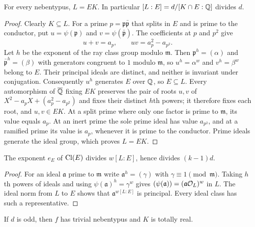 \begin{lemma}\label{dir:lem:valuefield}
For every nebentypus, $L=EK$. In particular $[L:E]=d/[K\cap E:\mathbb{Q}]$ divides $d$.
\end{lemma}

\begin{proof}
Clearly $K\subseteq L$. For a prime $p=\mathfrak p\bar{\mathfrak p}$ that splits in $E$
and is prime to the conductor, put $u=\psi(\mathfrak p)$ and
$v=\psi(\bar{\mathfrak p})$. The coefficients at $p$ and $p^2$ give
\[
 u+v=a_p,\qquad uv=a_p^2-a_{p^2}.
\]
Let $h$ be the exponent of the ray class group modulo $\mathfrak m$. Then
$\mathfrak p^h=(\alpha)$ and $\bar{\mathfrak p}^h=(\beta)$ with generators congruent to
$1$ modulo $\mathfrak m$, so $u^h=\alpha^w$ and $v^h=\beta^w$ belong to $E$. Their
principal ideals are distinct, and neither is invariant under conjugation.
Consequently $u^h$ generates $E$ over $\mathbb{Q}$, so $E\subseteq L$. Every automorphism of
$\overline{\mathbb{Q}}$ fixing $EK$ preserves the pair of roots $u,v$ of
$X^2-a_pX+(a_p^2-a_{p^2})$ and fixes their distinct $h$th powers; it therefore fixes
each root, and $u,v\in EK$. At a split prime where only one factor is prime to
$\mathfrak m$, its value equals $a_p$. At an inert prime the sole prime ideal has value
$a_{p^2}$, and at a ramified prime its value is $a_p$, whenever it is prime to the
conductor. Prime ideals generate the ideal group, which proves $L=EK$.
\end{proof}

\begin{lemma}\label{dir:lem:cmexponent}
The exponent $e_E$ of $\operatorname{Cl}(E)$ divides $w[L:E]$, hence divides $(k-1)d$.
\end{lemma}

\begin{proof}
For an ideal $\mathfrak a$ prime to $\mathfrak m$ write $\mathfrak a^h=(\gamma)$ with
$\gamma\equiv1\pmod{\mathfrak m}$. Taking $h$th powers of ideals and using
$\psi(\mathfrak a)^h=\gamma^w$ gives $(\psi(\mathfrak a))=(\mathfrak a\mathcal{O}_L)^w$ in $L$.
The ideal norm from $L$ to $E$ shows that $\mathfrak a^{w[L:E]}$ is principal. Every
ideal class has such a representative.
\end{proof}

\begin{lemma}\label{dir:lem:oddneben}
If $d$ is odd, then $f$ has trivial nebentypus and $K$ is totally real.
\end{lemma}

